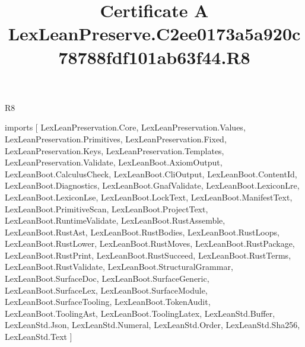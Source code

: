 \begin{lexlean}{R8}
\title{Certificate A LexLeanPreserve.C2ee0173a5a920c78788fdf101ab63f44.R8}
\begin{coremodule}
imports [
  LexLeanPreservation.Core,
  LexLeanPreservation.Values,
  LexLeanPreservation.Primitives,
  LexLeanPreservation.Fixed,
  LexLeanPreservation.Keys,
  LexLeanPreservation.Templates,
  LexLeanPreservation.Validate,
  LexLeanBoot.AxiomOutput,
  LexLeanBoot.CalculusCheck,
  LexLeanBoot.CliOutput,
  LexLeanBoot.ContentId,
  LexLeanBoot.Diagnostics,
  LexLeanBoot.GnafValidate,
  LexLeanBoot.LexiconLre,
  LexLeanBoot.LexiconLse,
  LexLeanBoot.LockText,
  LexLeanBoot.ManifestText,
  LexLeanBoot.PrimitiveScan,
  LexLeanBoot.ProjectText,
  LexLeanBoot.RuntimeValidate,
  LexLeanBoot.RustAssemble,
  LexLeanBoot.RustAst,
  LexLeanBoot.RustBodies,
  LexLeanBoot.RustLoops,
  LexLeanBoot.RustLower,
  LexLeanBoot.RustMoves,
  LexLeanBoot.RustPackage,
  LexLeanBoot.RustPrint,
  LexLeanBoot.RustSucceed,
  LexLeanBoot.RustTerms,
  LexLeanBoot.RustValidate,
  LexLeanBoot.StructuralGrammar,
  LexLeanBoot.SurfaceDoc,
  LexLeanBoot.SurfaceGeneric,
  LexLeanBoot.SurfaceLex,
  LexLeanBoot.SurfaceModule,
  LexLeanBoot.SurfaceTooling,
  LexLeanBoot.TokenAudit,
  LexLeanBoot.ToolingAst,
  LexLeanBoot.ToolingLatex,
  LexLeanStd.Buffer,
  LexLeanStd.Json,
  LexLeanStd.Numeral,
  LexLeanStd.Order,
  LexLeanStd.Sha256,
  LexLeanStd.Text
]


\end{coremodule}
\end{lexlean}
